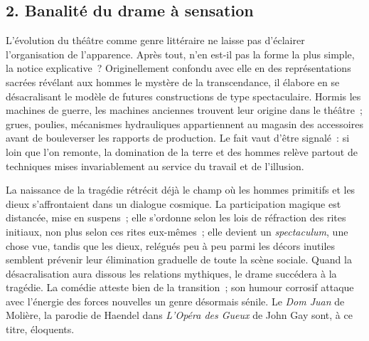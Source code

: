 \documentclass[french,twoside]{book} %
\begin{document}
\subsection[{2. Banalité du drame à sensation}]{\textsc{2.} Banalité du drame à sensation}
\noindent L’évolution du théâtre comme genre littéraire ne laisse pas d’éclairer l’organisation de l’apparence. Après tout, n’en est-il pas la forme la plus simple, la notice explicative ? Originellement confondu avec elle en des représentations sacrées révélant aux hommes le mystère de la transcendance, il élabore en se désacralisant le modèle de futures constructions de type spectaculaire. Hormis les machines de guerre, les machines anciennes trouvent leur origine dans le théâtre ; grues, poulies, mécanismes hydrauliques appartiennent au magasin des accessoires avant de bouleverser les rapports de production. Le fait vaut d’être signalé : si loin que l’on remonte, la domination de la terre et des hommes relève partout de techniques mises invariablement au service du travail et de l’illusion.\par
La naissance de la tragédie rétrécit déjà le champ où les hommes primitifs et les dieux s’affrontaient dans un dialogue cosmique. La participation magique est distancée, mise en suspens ; elle s’ordonne selon les lois de réfraction des rites initiaux, non plus selon ces rites eux-mêmes ; elle devient un \emph{spectaculum}, une chose vue, tandis que les dieux, relégués peu à peu parmi les décors inutiles semblent prévenir leur élimination graduelle de toute la scène sociale. Quand la désacralisation aura dissous les relations mythiques, le drame succédera à la tragédie. La comédie atteste bien de la transition ; son humour corrosif attaque avec l’énergie des forces nouvelles un genre désormais sénile. Le \emph{Dom Juan} de Molière, la parodie de Haendel dans \emph{L’Opéra des Gueux} de John Gay sont, à ce titre, éloquents.\par
\end{document}
